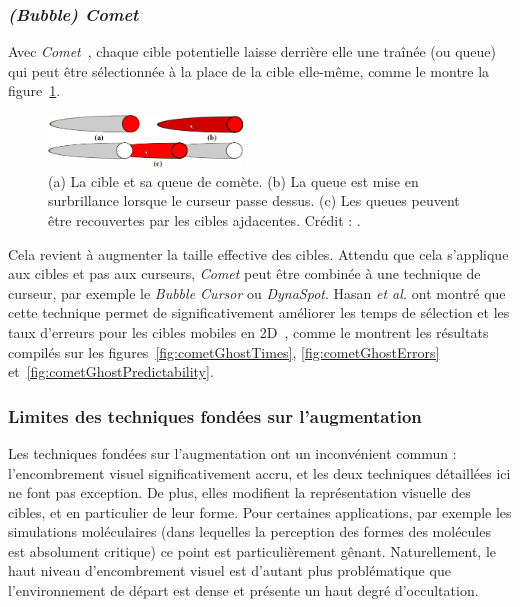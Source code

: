 	\subsubsection{\emph{(Bubble) Comet}}
	Avec \emph{Comet}~\cite{hasan2011comet}, chaque cible potentielle laisse derrière elle une traînée (ou queue) qui peut être sélectionnée à la place de la cible elle-même, comme le montre la figure~\ref{fig:comet}.

	\begin{figure}
		\centering
		\includegraphics[width=0.46\textwidth]{figures/ch2/comet}
		\caption[La technique \emph{Comet}]{(a) La cible et sa queue de comète. (b) La queue est mise en surbrillance lorsque le curseur passe dessus. (c) Les queues peuvent être recouvertes par les cibles ajdacentes. Crédit : \cite{hasan2011comet}.}
		\label{fig:comet}
	\end{figure}
	
	Cela revient à augmenter la taille effective des cibles. Attendu que cela s'applique aux cibles et pas aux curseurs, \emph{Comet} peut être combinée à une technique de curseur, par exemple le \emph{Bubble Cursor} ou \emph{DynaSpot}. Hasan \emph{et al.} ont montré que cette technique permet de significativement améliorer les temps de sélection et les taux d'erreurs pour les cibles mobiles en 2D~\cite{hasan2011comet}, comme le montrent les résultats compilés sur les figures~\ref{fig:cometGhostTimes}, \ref{fig:cometGhostErrors} et~\ref{fig:cometGhostPredictability}.

	\subsubsection{Limites des techniques fondées sur l'augmentation}
	Les techniques fondées sur l'augmentation ont un inconvénient commun : l'encombrement visuel significativement accru, et les deux techniques détaillées ici ne font pas exception. De plus, elles modifient la représentation visuelle des cibles, et en particulier de leur forme. Pour certaines applications, par exemple les simulations moléculaires (dans lequelles la perception des formes des molécules est absolument critique) ce point est particulièrement gênant. Naturellement, le haut niveau d'encombrement visuel est d'autant plus problématique que l'environnement de départ est dense et présente un haut degré d'occultation.

